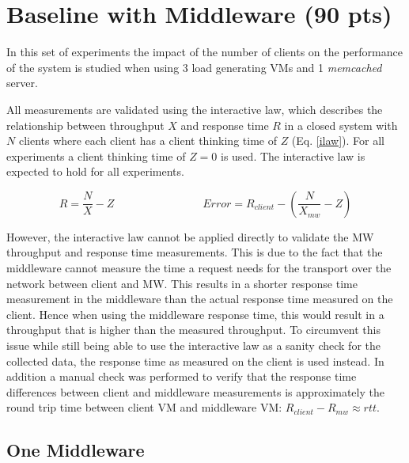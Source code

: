 \documentclass[report.tex]{subfiles}
\begin{document}
\section{Baseline with Middleware (90 pts)}\label{exp3}


In this set of experiments the impact of the number of clients on the  performance of the system is studied when using 3 load generating VMs and 1 \emph{memcached} server. 

All measurements are validated using the interactive law, which describes the relationship between throughput $X$ and response time $R$ in a closed system with $N$ clients where each client has a client thinking time of $Z$ (Eq. \ref{ilaw}). For all experiments a client thinking time of $Z = 0$ is used. The interactive law is expected to hold for all experiments.

\begin{equation}\label{ilaw}
R = \frac{N}{X} - Z
\qquad\qquad\qquad\qquad
Error = R_{client} - (\frac{N}{X_{mw}}  - Z)
\end{equation}

However, the interactive law cannot be applied directly to validate the MW throughput and response time measurements.
This is due to the fact that the middleware cannot measure the time a request needs for the transport over the network between client and MW. This results in a shorter response time measurement in the middleware than the actual response time measured on the client.
Hence when using the middleware response time, this would result in a throughput that is higher than the measured throughput.
To circumvent this issue while still being able to use the interactive law as a sanity check for the collected data, the response time as measured on the client is used instead. In addition a manual check was performed to verify that the response time differences between client and middleware measurements is approximately the round trip time between client VM and middleware VM: $R_{client} - R_{mw} \approx rtt$.


\subsection{One Middleware}\label{exp31}
\end{document}
